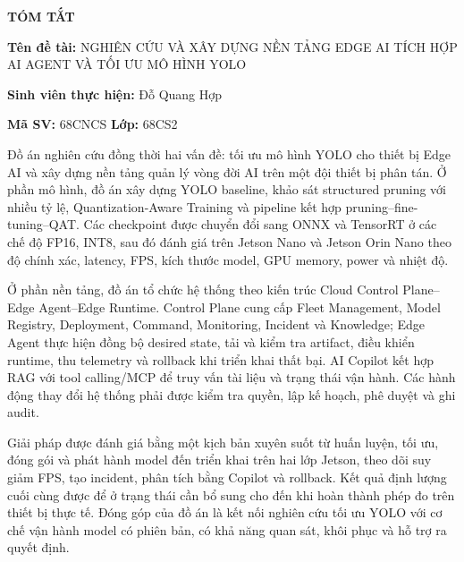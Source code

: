 \thispagestyle{empty}
\begin{center}{\Large\bfseries TÓM TẮT}\end{center}

\noindent\textbf{Tên đề tài:} NGHIÊN CỨU VÀ XÂY DỰNG NỀN TẢNG EDGE AI TÍCH HỢP
AI AGENT VÀ TỐI ƯU MÔ HÌNH YOLO

\noindent\textbf{Sinh viên thực hiện:} Đỗ Quang Hợp

\noindent\textbf{Mã SV:} 68CNCS \hspace{3cm} \textbf{Lớp:} 68CS2

Đồ án nghiên cứu đồng thời hai vấn đề: tối ưu mô hình YOLO cho thiết bị Edge AI
và xây dựng nền tảng quản lý vòng đời AI trên một đội thiết bị phân tán. Ở phần
mô hình, đồ án xây dựng YOLO baseline, khảo sát structured pruning với nhiều tỷ
lệ, Quantization-Aware Training và pipeline kết hợp pruning--fine-tuning--QAT.
Các checkpoint được chuyển đổi sang ONNX và TensorRT ở các chế độ FP16, INT8,
sau đó đánh giá trên Jetson Nano và Jetson Orin Nano theo độ chính xác, latency,
FPS, kích thước model, GPU memory, power và nhiệt độ.

Ở phần nền tảng, đồ án tổ chức hệ thống theo kiến trúc Cloud Control Plane--Edge
Agent--Edge Runtime. Control Plane cung cấp Fleet Management, Model Registry,
Deployment, Command, Monitoring, Incident và Knowledge; Edge Agent thực hiện
đồng bộ desired state, tải và kiểm tra artifact, điều khiển runtime, thu telemetry
và rollback khi triển khai thất bại. AI Copilot kết hợp RAG với tool calling/MCP
để truy vấn tài liệu và trạng thái vận hành. Các hành động thay đổi hệ thống phải
được kiểm tra quyền, lập kế hoạch, phê duyệt và ghi audit.

Giải pháp được đánh giá bằng một kịch bản xuyên suốt từ huấn luyện, tối ưu,
đóng gói và phát hành model đến triển khai trên hai lớp Jetson, theo dõi suy giảm
FPS, tạo incident, phân tích bằng Copilot và rollback. Kết quả định lượng cuối
cùng được để ở trạng thái cần bổ sung cho đến khi hoàn thành phép đo trên thiết
bị thực tế. Đóng góp của đồ án là kết nối nghiên cứu tối ưu YOLO với cơ chế vận
hành model có phiên bản, có khả năng quan sát, khôi phục và hỗ trợ ra quyết định.
\newpage